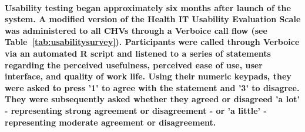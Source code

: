 \paragraph{Usability testing began approximately six months after launch of the system. A modified version of the Health IT Usability Evaluation Scale \citep{Yen2010} was administered to all CHVs through a Verboice call flow (see Table~\ref{tab:usabilitysurvey}). Participants were called through Verboice via an automated R script and listened to a series of statements regarding the perceived usefulness, perceived ease of use, user interface, and quality of work life. Using their numeric keypads, they were asked to press '1' to agree with the statement and '3' to disagree. They were subsequently asked whether they agreed or disagreed 'a lot' - representing strong agreement or disagreement -  or 'a little' - representing moderate agreement or disagreement.}



